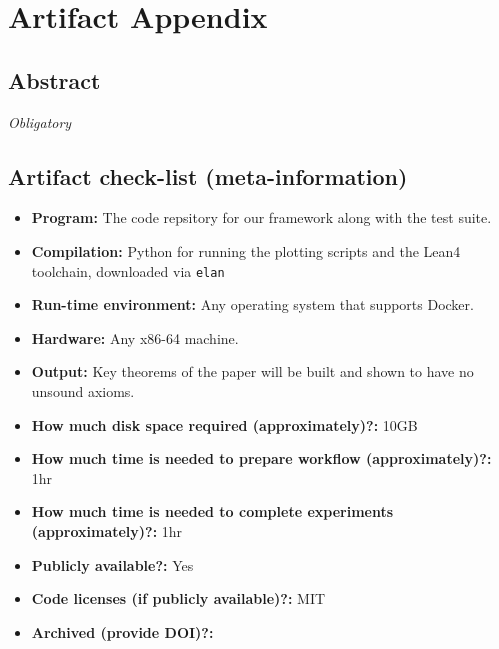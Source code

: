 \documentclass{sigplanconf}
\begin{document}


\appendix
\section{Artifact Appendix}

\subsection{Abstract}

{\em Obligatory}

\subsection{Artifact check-list (meta-information)}


{\small
\begin{itemize}
  \item {\bf Program: } The code repsitory for our framework along with the test suite.
  \item {\bf Compilation: } Python for running the plotting scripts and the Lean4 toolchain, downloaded via \texttt{elan}
  \item {\bf Run-time environment: } Any operating system that supports Docker.
  \item {\bf Hardware: } Any x86-64 machine.
  \item {\bf Output: } Key theorems of the paper will be built and shown to have no unsound axioms.
  \item {\bf How much disk space required (approximately)?: } 10GB
  \item {\bf How much time is needed to prepare workflow (approximately)?: } 1hr
  \item {\bf How much time is needed to complete experiments (approximately)?: } 1hr
  \item {\bf Publicly available?: } Yes
  \item {\bf Code licenses (if publicly available)?: } MIT
  \item {\bf Archived (provide DOI)?: }
\end{itemize}
}
\end{document}
